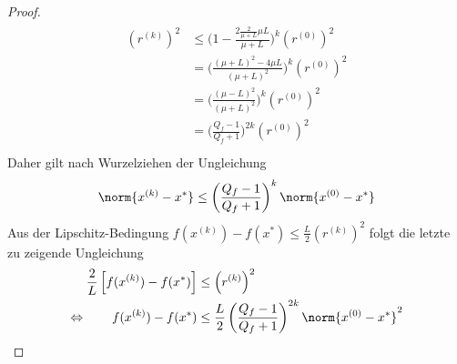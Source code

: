 \begin{proof}
\begin{gather*}
\begin{aligned}
                \left(r^{(k)}\right)^2 & \leq \bigg(1 - \frac{2 \frac{2}{\mu + L} \mu L}{\mu+L}\bigg)^k \left(r^{(0)}\right)^2 \\
                & = \bigg(\frac{(\mu + L)^2 - 4\mu L}{(\mu + L)^2}\bigg)^k \left(r^{(0)}\right)^2 \\
                & = \bigg(\frac{(\mu - L)^2}{(\mu + L)^2}\bigg)^k \left(r^{(0)}\right)^2 \\
                & = \bigg(\frac{Q_f - 1}{Q_f + 1}\bigg)^{2k} \left(r^{(0)}\right)^2 \\
              \end{aligned}
      \end{gather*}
      Daher gilt nach Wurzelziehen der Ungleichung
      \begin{equation*}
        \norm{x^{(k)}-x^\ast}  \leq \left(\frac{Q_f-1}{Q_f+1}\right)^k \norm{x^{(0)}-x^\ast} \\
      \end{equation*}
      Aus der Lipschitz-Bedingung $f(x^{(k)})-f(x^\ast) \leq \frac{L}{2} \left(r^{(k)}\right)^2$ folgt die letzte zu zeigende Ungleichung
      \begin{gather*}
        \begin{aligned}
          \frac{2}{L} \left[ f(x^{(k)})-f(x^\ast) \right] & \leq \left(r^{(k)}\right)^2 \\
          \Leftrightarrow \qquad  f(x^{(k)})-f(x^\ast) & \leq \frac{L}{2} \left(\frac{Q_f-1}{Q_f+1}\right)^{2k} \norm{x^{(0)}-x^\ast}^2
        \end{aligned}
      \end{gather*}
\end{proof}








